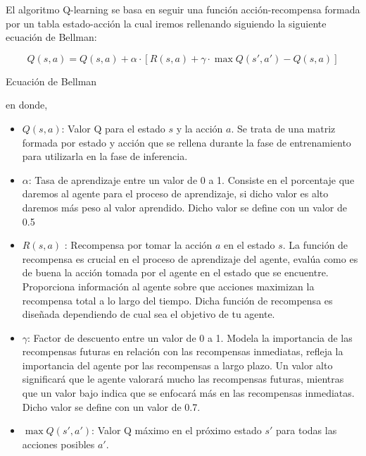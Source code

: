   El algoritmo Q-learning se basa en seguir una función acción-recompensa formada por un tabla estado-acción la cual iremos rellenando siguiendo la siguiente ecuación
  de Bellman\cite{Bellman}:
  \begin{myequation}[ht]
    \begin{equation}
      Q(s, a) = Q(s, a) + \alpha \cdot [R(s, a) + \gamma \cdot \max Q(s', a') - Q(s, a)]
      \label{eq:bellman}
    \end{equation}
    \caption{Ecuación de Bellman}
  \end{myequation}

  en donde, 

  \begin{itemize}
    \item \textbf{$Q(s, a)$}: Valor Q para el estado $s$ y la acción $a$. Se trata de una matriz formada por estado y acción que se rellena durante la fase de entrenamiento para utilizarla
    en la fase de inferencia.
    \item \textbf{$\alpha$}: Tasa de aprendizaje entre un valor de 0 a 1. Consiste en el porcentaje que daremos al agente para el proceso de aprendizaje, 
    si dicho valor es alto daremos más peso al valor aprendido. Dicho valor se define con un valor de 0.5 
    \item \textbf{$R(s, a)$ }: Recompensa por tomar la acción $a$ en el estado $s$. La función de recompensa es crucial en el proceso de aprendizaje del agente, 
    evalúa como es de buena la acción tomada por el agente en el estado que se encuentre. Proporciona información al agente sobre que acciones maximizan la recompensa total a lo largo del tiempo. Dicha función
    de recompensa es diseñada dependiendo de cual sea el objetivo de tu agente. 
    \item \textbf{$\gamma$}: Factor de descuento entre un valor de 0 a 1. Modela la importancia de las recompensas futuras en relación con las recompensas inmediatas, refleja la importancia del agente
    por las recompensas a largo plazo. Un valor alto significará que le agente valorará mucho las recompensas futuras, mientras que un valor bajo indica que se enfocará más en las recompensas
    inmediatas. Dicho valor se define con un valor de 0.7.
    \item \textbf{$\max Q(s', a')$}: Valor Q máximo en el próximo estado $s'$ para todas las acciones posibles $a'$.
\end{itemize}

